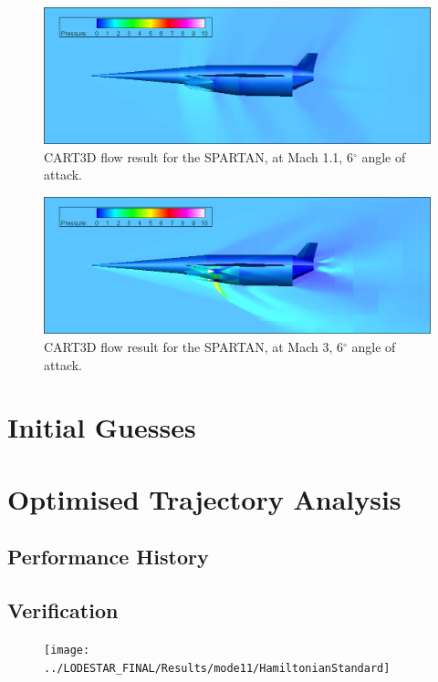 		\begin{figure}
			\centering
			\includegraphics[width=0.9\linewidth]{figures/3_vehicle_design/M1p1AoA6}
			\caption{CART3D flow result for the SPARTAN, at Mach 1.1, 6$^\circ$ angle of attack.}
			\label{fig:M1}
		\end{figure}
		\begin{figure}
			\centering
			\includegraphics[width=0.9\linewidth]{figures/3_vehicle_design/M3AoA6}
			\caption{CART3D flow result for the SPARTAN, at Mach 3, 6$^\circ$ angle of attack.}
			\label{fig:M3AoA6}
		\end{figure}
		
		
		
		
		\chapter{Initial Guesses}
		
		\chapter{Optimised Trajectory Analysis}
		
		
	
		
		\section{Performance History}
		
		
		\section{Verification}
		\begin{figure}
			\centering
			\texttt{[image: ../LODESTAR\_FINAL/Results/mode11/HamiltonianStandard]}
			\caption{}
			\label{fig:HamiltonianStandard}
		\end{figure}
		

